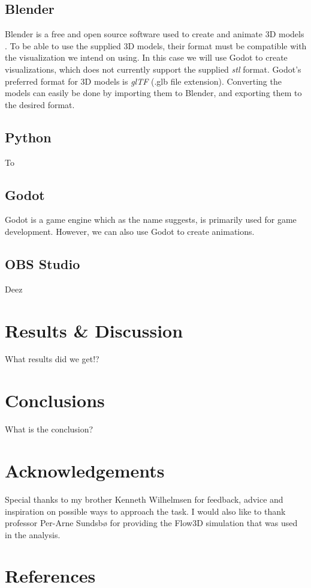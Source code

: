 \documentclass[a4paper,11pt]{extarticle}
\begin{document}
\subsection{Blender}
Blender is a free and open source software used to create and animate 3D models \citep{blender}. To be able to use the supplied 3D models, their format must be compatible with the visualization we intend on using. In this case we will use Godot to create visualizations, which does not currently support the supplied \textit{stl} format. Godot's preferred format for 3D models is \textit{glTF} (.glb file extension). Converting the models can easily be done by importing them to Blender, and exporting them to the desired format.

\subsection{Python}
To

\subsection{Godot}
Godot is a game engine which as the name suggests, is primarily used for game development. However, we can also use Godot to create animations.

\subsection{OBS Studio}
Deez

\section{Results \& Discussion}
What results did we get!?

\section{Conclusions}
What is the conclusion?

\section{Acknowledgements}
Special thanks to my brother Kenneth Wilhelmsen for feedback, advice and inspiration on possible ways to approach the task. I would also like to thank professor Per-Arne Sundsbø for providing the Flow3D simulation that was used in the analysis.

\section{References}
\begingroup
\def\section*#1{}


\endgroup
\end{document}
